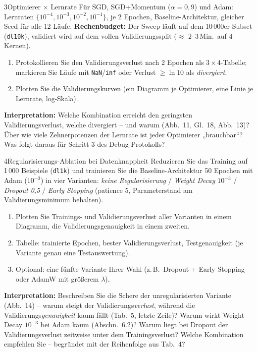 \documentclass[11pt,a4paper]{article}
\newcommand{\code}[1]{\texttt{#1}}
\begin{document}
\begin{aufgabe}{3}{Optimierer $\times$ Lernrate}
Für SGD, SGD+Momentum ($\alpha = 0{,}9$) und Adam: Lernraten $\{10^{-4}, 10^{-3}, 10^{-2}, 10^{-1}\}$, je 2 Epochen, Baseline-Architektur, gleicher Seed für alle 12 Läufe. \textbf{Rechenbudget:} Der Sweep läuft auf dem 10\,000er-Subset (\code{dl10k}), validiert wird auf dem vollen Validierungssplit ($\approx$ 2--3\,Min.\ auf 4 Kernen).
\begin{enumerate}
  \item Protokollieren Sie den Validierungsverlust nach 2 Epochen als $3\times 4$-Tabelle; markieren Sie Läufe mit \code{NaN}/\code{inf} oder Verlust $\ge \ln 10$ als \emph{divergiert}.
  \item Plotten Sie die Validierungskurven (ein Diagramm je Optimierer, eine Linie je Lernrate, log-Skala).
\end{enumerate}
\begin{leitfragen}\small
\textbf{Interpretation:} Welche Kombination erreicht den geringsten Validierungsverlust, welche divergiert -- und warum (Abb.\ 11, Gl.\ 18, Abb.\ 13)? Über wie viele Zehnerpotenzen der Lernrate ist jeder Optimierer „brauchbar“? Was folgt daraus für Schritt 3 des Debug-Protokolls?
\end{leitfragen}
\end{aufgabe}

\begin{aufgabe}{4}{Regularisierungs-Ablation bei Datenknappheit}
Reduzieren Sie das Training auf 1\,000 Beispiele (\code{dl1k}) und trainieren Sie die Baseline-Architektur 50 Epochen mit Adam ($10^{-3}$) in vier Varianten: \emph{keine Regularisierung} / \emph{Weight Decay $10^{-3}$} / \emph{Dropout 0,5} / \emph{Early Stopping} (patience 5, Parameterstand am Validierungsminimum behalten).
\begin{enumerate}
  \item Plotten Sie Trainings- und Validierungsverlust aller Varianten in einem Diagramm, die Validierungsgenauigkeit in einem zweiten.
  \item Tabelle: trainierte Epochen, bester Validierungsverlust, Testgenauigkeit (je Variante genau eine Testauswertung).
  \item Optional: eine fünfte Variante Ihrer Wahl (z.\,B.\ Dropout + Early Stopping oder AdamW mit größerem $\lambda$).
\end{enumerate}
\begin{leitfragen}\small
\textbf{Interpretation:} Beschreiben Sie die Schere der unregularisierten Variante (Abb.\ 14) -- warum steigt der Validierungs\emph{verlust}, während die Validierungs\emph{genauigkeit} kaum fällt (Tab.\ 5, letzte Zeile)? Warum wirkt Weight Decay $10^{-3}$ bei Adam kaum (Abschn.\ 6.2)? Warum liegt bei Dropout der Validierungsverlust zeitweise unter dem Trainingsverlust? Welche Kombination empfehlen Sie -- begründet mit der Reihenfolge aus Tab.\ 4?
\end{leitfragen}
\end{aufgabe}
\end{document}
